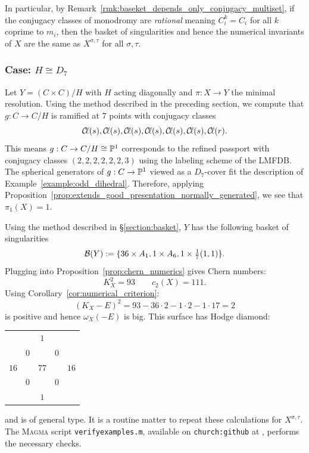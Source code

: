 \documentclass[main.tex]{subfiles}
\begin{document}
In particular, by Remark~\ref{rmk:baseket_depends_only_conjugacy_multiset}, if the conjugacy classes of monodromy are \textit{rational} meaning $C_i^{k} = C_i$ for all $k$ coprime to $m_i$, then the basket of singularities and hence the numerical invariants of $X$ are the same as $X^{\sigma, \tau}$ for all $\sigma,\tau$. 

\subsubsection{Case: $H \cong D_{7}$} \label{section:case_D7}

Let $Y = (C \times C)/H$ with $H$ acting diagonally and $\pi : X \to Y$ the minimal resolution. 
Using the method described in the preceding section, we compute that $g : C \to C / H$ is ramified at $7$ points with conjugacy classes
\[ \Cl(s), \Cl(s), \Cl(s), \Cl(s), \Cl(s), \Cl(s), \Cl(r). \]
This means $g : C \to C / H \cong \P^1$ corresponds to the refined passport 
\cite{lmfdb:hgcwa-14.14-1.0.2-2-2-2-2-2-7.1} with conjugacy classes $(2, 2, 2, 2, 2, 2, 3)$ using the labeling scheme of the LMFDB. The spherical generators of $g : C \to \P^1$ viewed as a $D_{7}$-cover fit the description of Example~\ref{example:odd_dihedral}. Therefore, applying Proposition~\ref{prop:extends_good_presentation_normally_generated}, we see that $\pi_1(X) = 1$. 
\par 
Using the method described in \S\ref{section:basket}, $Y$ has the following basket of singularities
\[ \cB(Y) := \{ 36 \times A_1, 1 \times A_6, 1 \times \tfrac{1}{7} (1,1) \}. \]
Plugging into Proposition~\ref{prop:chern_numerics} gives Chern numbers:
\[ K_X^2 = 93 \quad \quad c_2(X) = 111. \]
Using Corollary~\ref{cor:numerical_criterion}:
\[ (K_X - E)^2 = 93 - 36 \cdot 2 - 1 \cdot 2 - 1 \cdot 17 = 2 \]
is positive and hence $\omega_X(-E)$ is big. This surface has Hodge diamond:
\begin{center}
\begin{tabular}{ccccc}
 &  & $1$ &  &  \\
 & $0$ &  & $0$ &  \\
$16$ &  & $77$ &  & $16$ \\
 & $0$ &  & $0$ &  \\
 &  & $1$ &  &  \\
\end{tabular}    
\end{center}
and is of general type. It is a routine matter to repeat these calculations for $X^{\sigma, \tau}$. The \textsc{Magma} script \texttt{verify\textunderscore examples.m}, available on \texttt{church:github} at \cite{church:github}, performs the necessary checks.
\end{document}

